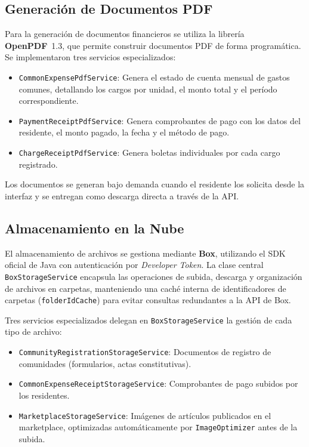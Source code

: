 \subsection{Generación de Documentos PDF}
Para la generación de documentos financieros se utiliza la librería \textbf{OpenPDF}~1.3, que permite construir documentos PDF de forma programática. Se implementaron tres servicios especializados:

\begin{itemize}
    \item \texttt{CommonExpensePdfService}: Genera el estado de cuenta mensual de gastos comunes, detallando los cargos por unidad, el monto total y el período correspondiente.
    \item \texttt{PaymentReceiptPdfService}: Genera comprobantes de pago con los datos del residente, el monto pagado, la fecha y el método de pago.
    \item \texttt{ChargeReceiptPdfService}: Genera boletas individuales por cada cargo registrado.
\end{itemize}

Los documentos se generan bajo demanda cuando el residente los solicita desde la interfaz y se entregan como descarga directa a través de la API.

\subsection{Almacenamiento en la Nube}
El almacenamiento de archivos se gestiona mediante \textbf{Box}, utilizando el SDK oficial de Java con autenticación por \textit{Developer Token}. La clase central \texttt{BoxStorageService} encapsula las operaciones de subida, descarga y organización de archivos en carpetas, manteniendo una caché interna de identificadores de carpetas (\texttt{folderIdCache}) para evitar consultas redundantes a la API de Box.

Tres servicios especializados delegan en \texttt{BoxStorageService} la gestión de cada tipo de archivo:

\begin{itemize}
    \item \texttt{CommunityRegistrationStorageService}: Documentos de registro de comunidades (formularios, actas constitutivas).
    \item \texttt{CommonExpenseReceiptStorageService}: Comprobantes de pago subidos por los residentes.
    \item \texttt{MarketplaceStorageService}: Imágenes de artículos publicados en el marketplace, optimizadas automáticamente por \texttt{ImageOptimizer} antes de la subida.
\end{itemize}

